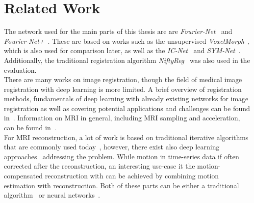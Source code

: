 \section{Related Work} \label{Sec:RelatedWork}
The network used for the main parts of this thesis are are \emph{Fourier-Net}~\cite{Fourier-Net} and \emph{Fourier-Net+}~\cite{Fourier-Net+}. These are based on works such as the unsupervised \emph{VoxelMorph}~\cite{Voxelmorph}, which is also used for comparison later, as well as the \emph{IC-Net}~\cite{IC-Net} and \emph{SYM-Net}~\cite{SYM-Net}. Additionally, the traditional registration algorithm \emph{NiftyReg}~\cite{NiftiReg} was also used in the evaluation.\\
There are many works on image registration, though the field of medical image registration with deep learning is more limited. A brief overview of registration methods, fundamentals of deep learning with already existing networks for image registration as well as covering potential applications and challenges can be found in~\cite{Chen2020,Haskins2020,Fu2020,Zou2022,Chen2023}. Information on MRI in general, including MRI sampling and acceleration, can be found in~\cite{Serai2021,SamplingStrategies,PulseSequences,AdvancesPI,CS-MRI}.\\
For MRI reconstruction, a lot of work is based on traditional iterative algorithms that are commonly used today~\cite{AdvancesPI,CS-MRI,ParallelMRI,GRAPPA}, however, there exist also deep learning approaches~\cite{DeepMRIReconstructionRadialSubsampling,DeepMRIReconstructionSubsampling}
addressing the problem. While motion in time-series data if often corrected after the reconstruction, an interesting use-case it the motion-compensated reconstruction with can be achieved by combining motion estimation with reconstruction. Both of these parts can be either a traditional algorithm~\cite{GRICS} or neural networks~\cite{Pan2024,Zou2024}.


